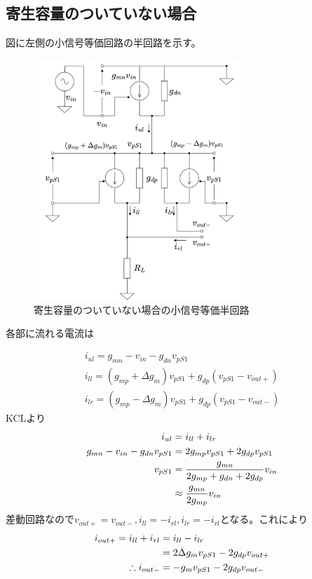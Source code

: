 \documentclass[twocolumn]{jsarticle}
\begin{document}
\subsection{寄生容量のついていない場合}
    図に左側の小信号等価回路の半回路を示す。
    \begin{figure}[h]
        \begin{center}
            \includegraphics*[width=80mm]{figures/FoldedGilbertHalfBaseEquivalentCircuit.png}
            \caption{寄生容量のついていない場合の小信号等価半回路}
            \label{fig:half_eq}
        \end{center}
    \end{figure}

    各部に流れる電流は

    \begin{align*}
        i_{ul} = g_{mn}-v_{in}-g_{dn}v_{pS1}\\
        i_{ll} = (g_{mp}+\Delta g_{m})v_{pS1}+g_{dp}(v_{pS1}-v_{out+})\\
        i_{lr} = (g_{mp}-\Delta g_{m})v_{pS1}+g_{dp}(v_{pS1}-v_{out-})
    \end{align*}
    KCLより
    \begin{align}
        i_{ul} &= i_{ll}+i_{lr}   \notag\\
        g_{mn}-v_{in}-g_{dn}v_{pS1} &= 2g_{mp}v_{pS1}+2g_{dp}v_{pS1}    \notag\\
        v_{pS1} &= \frac{g_{mn}}{ 2g_{mp}+g_{dn}+2g_{dp} }v_{in}    \notag\\
        &\approx \frac{g_{mn}}{2g_{mp}}v_{in}   \label{eq:vps1}
    \end{align}
    差動回路なので$v_{out+}=v_{out-},i_{ll}=-i_{rl},i_{lr}=-i_{rl}$となる。これにより
    \begin{align}
        i_{out+}=i_{ll}+i_{rl} &= i_{ll}-i_{lr}   \notag\\
        &= 2\Delta g_{m}v_{pS1}-2g_{dp}v_{out+}     \\
        \therefore i_{out-} &= -g_{m}v_{pS1}-2g_{dp}v_{out-}    \\
    \end{align}
\end{document}
